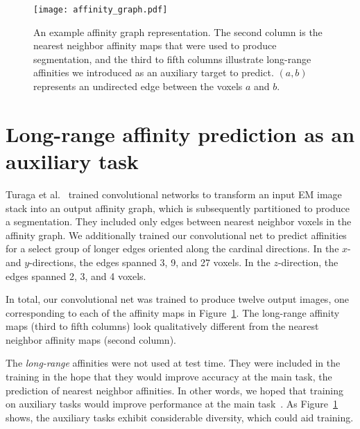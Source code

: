 \documentclass{article}
\begin{document}



\begin{figure}[!t]
\begin{center}
\texttt{[image: affinity\_graph.pdf]}
\end{center}

\caption{An example affinity graph representation. The second column is the
nearest neighbor affinity maps that were used to produce segmentation, and the
third to fifth columns illustrate long-range affinities we introduced as an
auxiliary target to predict. $(a,b)$ represents an undirected edge between the
voxels $a$ and $b$.}

\label{fig:affinity}
\end{figure}

\section{Long-range affinity prediction as an auxiliary task}
\label{long_range}

Turaga et al.~\cite{turaga2010} trained convolutional networks to transform an
input EM image stack into an output affinity graph, which is subsequently
partitioned to produce a segmentation. They included only edges between nearest
neighbor voxels in the affinity graph.  We additionally trained our
convolutional net to predict affinities for a select group of longer edges
oriented along the cardinal directions.  In the $x$- and $y$-directions, the
edges spanned 3, 9, and 27 voxels. In the $z$-direction, the edges spanned 2, 3,
and 4 voxels.

In total, our convolutional net was trained to produce twelve output images, one
corresponding to each of the affinity maps in Figure~\ref{fig:affinity}.  The
long-range affinity maps (third to fifth columns) look qualitatively different
from the nearest neighbor affinity maps (second column).

The \textit{long-range} affinities were not used at test time. They were
included in the training in the hope that they would improve accuracy at the
main task, the prediction of nearest neighbor affinities.  In other words, we
hoped that training on auxiliary tasks would improve performance at the main
task~\cite{zhang2014}.  As Figure~\ref{fig:affinity} shows, the auxiliary tasks
exhibit considerable diversity, which could aid training.
\end{document}
